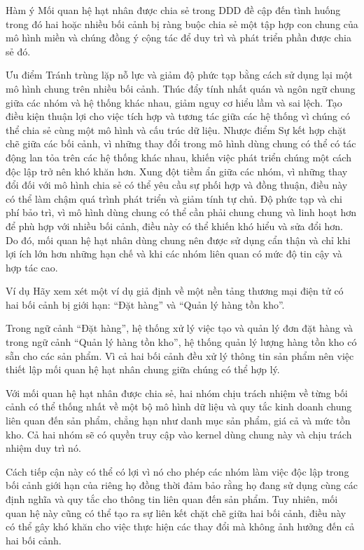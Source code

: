 Hàm ý
Mối quan hệ hạt nhân được chia sẻ trong DDD đề cập đến tình huống trong đó hai hoặc nhiều bối cảnh bị ràng buộc chia sẻ một tập hợp con chung của mô hình miền và chúng đồng ý cộng tác để duy trì và phát triển phần được chia sẻ đó.

Ưu điểm
Tránh trùng lặp nỗ lực và giảm độ phức tạp bằng cách sử dụng lại một mô hình chung trên nhiều bối cảnh.
Thúc đẩy tính nhất quán và ngôn ngữ chung giữa các nhóm và hệ thống khác nhau, giảm nguy cơ hiểu lầm và sai lệch.
Tạo điều kiện thuận lợi cho việc tích hợp và tương tác giữa các hệ thống vì chúng có thể chia sẻ cùng một mô hình và cấu trúc dữ liệu.
Nhược điểm
Sự kết hợp chặt chẽ giữa các bối cảnh, vì những thay đổi trong mô hình dùng chung có thể có tác động lan tỏa trên các hệ thống khác nhau, khiến việc phát triển chúng một cách độc lập trở nên khó khăn hơn.
Xung đột tiềm ẩn giữa các nhóm, vì những thay đổi đối với mô hình chia sẻ có thể yêu cầu sự phối hợp và đồng thuận, điều này có thể làm chậm quá trình phát triển và giảm tính tự chủ.
Độ phức tạp và chi phí bảo trì, vì mô hình dùng chung có thể cần phải chung chung và linh hoạt hơn để phù hợp với nhiều bối cảnh, điều này có thể khiến khó hiểu và sửa đổi hơn.
Do đó, mối quan hệ hạt nhân dùng chung nên được sử dụng cẩn thận và chỉ khi lợi ích lớn hơn những hạn chế và khi các nhóm liên quan có mức độ tin cậy và hợp tác cao.

Ví dụ
Hãy xem xét một ví dụ giả định về một nền tảng thương mại điện tử có hai bối cảnh bị giới hạn: “Đặt hàng” và “Quản lý hàng tồn kho”.

Trong ngữ cảnh “Đặt hàng”, hệ thống xử lý việc tạo và quản lý đơn đặt hàng và trong ngữ cảnh “Quản lý hàng tồn kho”, hệ thống quản lý lượng hàng tồn kho có sẵn cho các sản phẩm. Vì cả hai bối cảnh đều xử lý thông tin sản phẩm nên việc thiết lập mối quan hệ hạt nhân chung giữa chúng có thể hợp lý.

Với mối quan hệ hạt nhân được chia sẻ, hai nhóm chịu trách nhiệm về từng bối cảnh có thể thống nhất về một bộ mô hình dữ liệu và quy tắc kinh doanh chung liên quan đến sản phẩm, chẳng hạn như danh mục sản phẩm, giá cả và mức tồn kho. Cả hai nhóm sẽ có quyền truy cập vào kernel dùng chung này và chịu trách nhiệm duy trì nó.

Cách tiếp cận này có thể có lợi vì nó cho phép các nhóm làm việc độc lập trong bối cảnh giới hạn của riêng họ đồng thời đảm bảo rằng họ đang sử dụng cùng các định nghĩa và quy tắc cho thông tin liên quan đến sản phẩm. Tuy nhiên, mối quan hệ này cũng có thể tạo ra sự liên kết chặt chẽ giữa hai bối cảnh, điều này có thể gây khó khăn cho việc thực hiện các thay đổi mà không ảnh hưởng đến cả hai bối cảnh.


